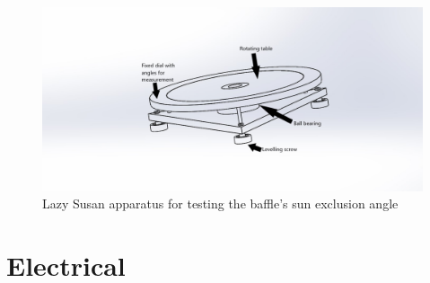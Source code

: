 \documentclass[../../main.tex]{subfiles}
\begin{document}
\begin{figure}[h]
    \centering
    \includegraphics[width=\textwidth]{Figures/Instrumentation/lazy_susan.jpg}
    \caption{Lazy Susan apparatus for testing the baffle's sun exclusion angle}
    \label{fig:13.1}    
\end{figure}



\section{Electrical} \label{sec:Electrical_test}

\end{document}
